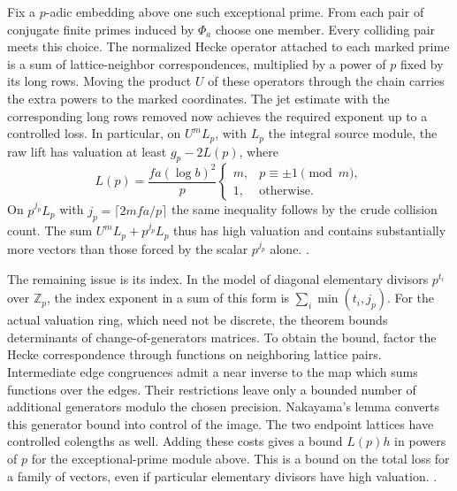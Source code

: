 Fix a \(p\)-adic embedding above one such exceptional prime. From each pair of conjugate finite primes induced by \(\Phi_a\) choose one member. Every colliding pair meets this choice. The normalized Hecke operator attached to each marked prime is a sum of lattice-neighbor correspondences, multiplied by a power of \(p\) fixed by its long rows. Moving the product \(U\) of these operators through the chain carries the extra powers to the marked coordinates. The jet estimate with the corresponding long rows removed now achieves the required exponent up to a controlled loss. In particular, on \(U^m L_p\), with \(L_p\) the integral source module, the raw lift has valuation at least \(g_p-2L(p)\), where
\[
 L(p)=\frac{fa(\log b)^2}{p}
          \begin{cases} m,&p\equiv\pm1\pmod m,\\
                         1,&\text{otherwise}.\end{cases}
\]
On \(p^{j_p}L_p\) with \(j_p=\lceil 2mfa/p\rceil\) the same inequality follows by the crude collision count. The sum \(U^mL_p+p^{j_p}L_p\) thus has high valuation and contains substantially more vectors than those forced by the scalar \(p^{j_p}\) alone. .

The remaining issue is its index. In the model of diagonal elementary divisors \(p^{t_i}\) over \(\mathbb Z_p\), the index exponent in a sum of this form is \(\sum_i\min(t_i,j_p)\). For the actual valuation ring, which need not be discrete, the theorem bounds determinants of change-of-generators matrices. To obtain the bound, factor the Hecke correspondence through functions on neighboring lattice pairs. Intermediate edge congruences admit a near inverse to the map which sums functions over the edges. Their restrictions leave only a bounded number of additional generators modulo the chosen precision. Nakayama's lemma converts this generator bound into control of the image. The two endpoint lattices have controlled colengths as well. Adding these costs gives a bound \(L(p)h\) in powers of \(p\) for the exceptional-prime module above. This is a bound on the total loss for a family of vectors, even if particular elementary divisors have high valuation. .

